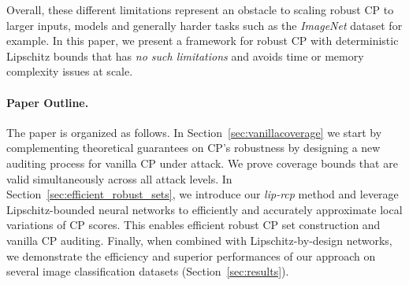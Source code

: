 Overall, these different limitations represent an obstacle to scaling robust CP to larger inputs, models and generally harder tasks such as the \textsl{ImageNet} dataset for example. In this paper, we present a framework for robust CP with deterministic Lipschitz bounds that has \textit{no such limitations} and avoids time or memory complexity issues at scale.

\paragraph{Paper Outline.} The paper is organized as follows. In Section~\ref{sec:vanillacoverage} we start by complementing theoretical guarantees on CP's robustness by designing a new auditing process for vanilla CP under attack. We prove coverage bounds that are valid simultaneously across all attack levels. In Section~\ref{sec:efficient_robust_sets}, we introduce our \emph{lip-rcp} method and leverage Lipschitz-bounded neural networks to efficiently and accurately approximate local variations of CP scores. This enables efficient robust CP set construction and vanilla CP auditing. Finally, when combined with Lipschitz-by-design networks, we demonstrate the efficiency and superior performances of our approach on several image classification datasets (Section~\ref{sec:results}).
